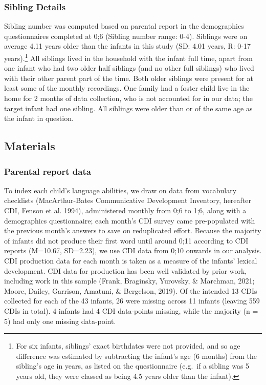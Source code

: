 \documentclass[
  man,mask,floatsintext]{apa6}
\begin{document}
\hypertarget{sibling-details}{%
\subsubsection{Sibling Details}\label{sibling-details}}

Sibling number was computed based on parental report in the demographics questionnaires completed at 0;6 (Sibling number range: 0-4). Siblings were on average 4.11 years older than the infants in this study (SD: 4.01 years, R: 0-17 years).\footnote{For six infants, siblings' exact birthdates were not provided, and so age difference was estimated by subtracting the infant's age (6 months) from the sibling's age in years, as listed on the questionnaire (e.g.~if a sibling was 5 years old, they were classed as being 4.5 years older than the infant).} All siblings lived in the household with the infant full time, apart from one infant who had two older half siblings (and no other full siblings) who lived with their other parent part of the time. Both older siblings were present for at least some of the monthly recordings. One family had a foster child live in the home for 2 months of data collection, who is not accounted for in our data; the target infant had one sibling. All siblings were older than or of the same age as the infant in question.

\hypertarget{materials}{%
\subsection{Materials}\label{materials}}

\hypertarget{parental-report-data}{%
\subsubsection{Parental report data}\label{parental-report-data}}

To index each child's language abilities, we draw on data from vocabulary checklists (MacArthur-Bates Communicative Development Inventory, hereafter CDI, Fenson et al. 1994), administered monthly from 0;6 to 1;6, along with a demographics questionnaire; each month's CDI survey came pre-populated with the previous month's answers to save on reduplicated effort. Because the majority of infants did not produce their first word until around 0;11 according to CDI reports (M=10.67, SD=2.23), we use CDI data from 0;10 onwards in our analysis. CDI production data for each month is taken as a measure of the infants' lexical development. CDI data for production has been well validated by prior work, including work in this sample (Frank, Braginsky, Yurovsky, \& Marchman, 2021; Moore, Dailey, Garrison, Amatuni, \& Bergelson, 2019). Of the intended 13 CDIs collected for each of the 43 infants, 26 were missing across 11 infants (leaving 559 CDIs in total). 4 infants had 4 CDI data-points missing, while the majority (n = 5) had only one missing data-point.
\end{document}
